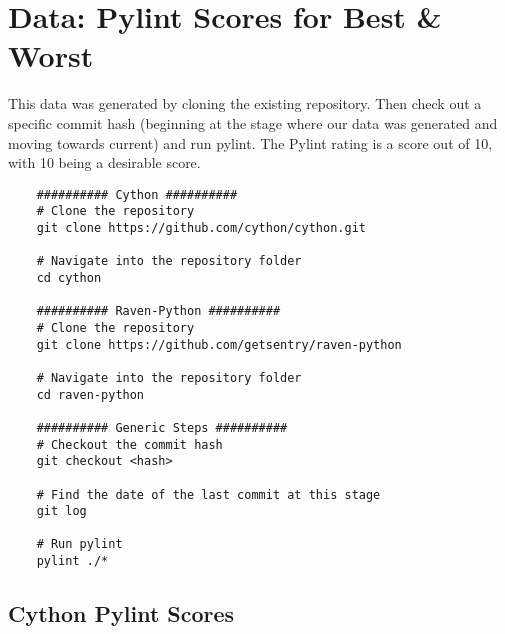 \section{Data: Pylint Scores for Best \& Worst} \label{appendixPylintScores}

\begin{singlespace}
  This data was generated by cloning the existing repository. Then check out a specific commit hash (beginning at the stage where our data was generated and moving towards current) and run pylint. The Pylint rating is a score out of 10, with 10 being a desirable score.
\end{singlespace}

\begin{singlespace}
  \small
  \begin{verbatim}
    ########## Cython ##########
    # Clone the repository
    git clone https://github.com/cython/cython.git

    # Navigate into the repository folder
    cd cython

    ########## Raven-Python ##########
    # Clone the repository
    git clone https://github.com/getsentry/raven-python

    # Navigate into the repository folder
    cd raven-python

    ########## Generic Steps ##########
    # Checkout the commit hash
    git checkout <hash>

    # Find the date of the last commit at this stage
    git log

    # Run pylint
    pylint ./*
  \end{verbatim}
\end{singlespace}

\newpage
\subsection{Cython Pylint Scores} \label{appendixPylintCython}


